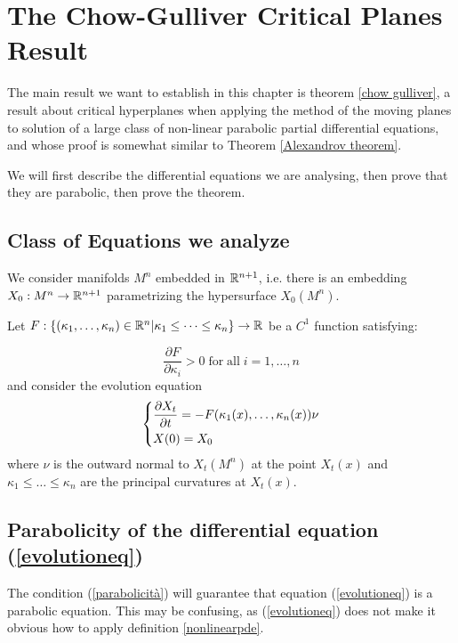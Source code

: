 \chapter{The Chow-Gulliver Critical Planes Result}

The main result we want to establish in this chapter is theorem \ref{chow gulliver}, a result about critical hyperplanes when applying the method of the moving planes to solution of a large class of non-linear parabolic partial differential equations, and whose proof is somewhat similar to Theorem \ref{Alexandrov theorem}. 

We will first describe the differential equations we are analysing, then prove that they are parabolic, then prove the theorem. 

\section{Class of Equations we analyze}

We consider manifolds $M^n$ embedded in $\mathbb{R}^{n+1}$, i.e. there is an embedding $X_0 : M^n \rightarrow \mathbb{R}^{n+1}$ parametrizing the hypersurface $X_0(M^n)$. 

Let $F:\{(\kappa_1, \dots , \kappa_n)\in \mathbb{R}^n\vert \kappa_1\leq \dots \leq \kappa_n\}\rightarrow \mathbb{R}$ be a $C^1$ function satisfying:

\begin{equation}
	\frac{\partial F}{\partial \kappa_i} > 0 \mathrm{\; for \; all } \; i=1,\dots, n \label{parabolicità}
\end{equation}
and consider the evolution equation 
\begin{align}
	\begin{dcases}
		\frac{\partial X_t}{\partial t} = - F(\kappa_1(x), \dots , \kappa_n(x)) \nu\\
		X(0)= X_0
	\end{dcases} \label{evolutioneq}
\end{align}
where $\nu$ is the outward normal to $X_t(M^n)$ at the point $X_t(x)$ and $\kappa_1\leq \dots \leq \kappa_n$ are the principal curvatures at $X_t(x)$. 


\section{Parabolicity of the differential equation (\ref{evolutioneq})}\label{parabolic}


The condition (\ref{parabolicità}) will  guarantee that equation (\ref{evolutioneq}) is a parabolic equation. This may be confusing, as (\ref{evolutioneq}) does not make it obvious how to apply definition \ref{nonlinearpde}. 

